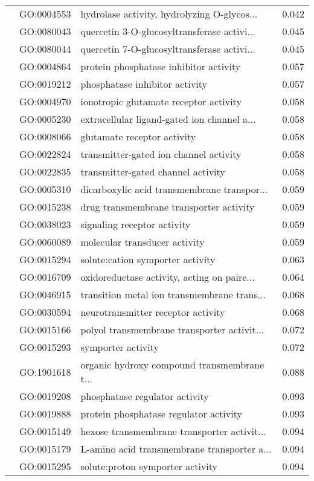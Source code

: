 \begin{longtable}{lllr}
   & GO:0004553 &  hydrolase activity, hydrolyzing O-glycos... &         0.042 \\
   & GO:0080043 &  quercetin 3-O-glucosyltransferase activi... &         0.045 \\
   & GO:0080044 &  quercetin 7-O-glucosyltransferase activi... &         0.045 \\
   & GO:0004864 &       protein phosphatase inhibitor activity &         0.057 \\
   & GO:0019212 &               phosphatase inhibitor activity &         0.057 \\
   & GO:0004970 &       ionotropic glutamate receptor activity &         0.058 \\
   & GO:0005230 &  extracellular ligand-gated ion channel a... &         0.058 \\
   & GO:0008066 &                  glutamate receptor activity &         0.058 \\
   & GO:0022824 &       transmitter-gated ion channel activity &         0.058 \\
   & GO:0022835 &           transmitter-gated channel activity &         0.058 \\
   & GO:0005310 &  dicarboxylic acid transmembrane transpor... &         0.059 \\
   & GO:0015238 &      drug transmembrane transporter activity &         0.059 \\
   & GO:0038023 &                  signaling receptor activity &         0.059 \\
   & GO:0060089 &                molecular transducer activity &         0.059 \\
   & GO:0015294 &             solute:cation symporter activity &         0.063 \\
   & GO:0016709 &  oxidoreductase activity, acting on paire... &         0.064 \\
   & GO:0046915 &  transition metal ion transmembrane trans... &         0.068 \\
   & GO:0030594 &           neurotransmitter receptor activity &         0.068 \\
   & GO:0015166 &  polyol transmembrane transporter activit... &         0.072 \\
   & GO:0015293 &                           symporter activity &         0.072 \\
   & GO:1901618 &  organic hydroxy compound transmembrane t... &         0.088 \\
   & GO:0019208 &               phosphatase regulator activity &         0.093 \\
   & GO:0019888 &       protein phosphatase regulator activity &         0.093 \\
   & GO:0015149 &  hexose transmembrane transporter activit... &         0.094 \\
   & GO:0015179 &  L-amino acid transmembrane transporter a... &         0.094 \\
   & GO:0015295 &             solute:proton symporter activity &         0.094 \\
\end{longtable}
